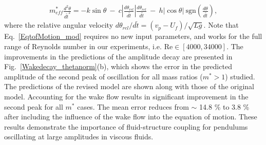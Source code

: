 \documentclass{jfm}
\begin{document}
{{	\begin{align}
	m_{eff}^* \frac{d^2 \theta}{d\tilde{t}^2}= - k \sin{\theta} \ - \ c \left| \frac{d \theta_{rel}}{d \tilde{t}}\right| \frac{d \theta_{rel}}{d \tilde{t}} \ - \ h \left | \cos{\theta} \right | \ \text{sgn} \left( \frac{d \theta} {d\tilde{t}} \right)
	\label{EqtofMotion_mod},
	\end{align}
	where the relative angular velocity $ {d\theta_{rel}}/{d\tilde{t}} = {(v_p - U_f)}/{\sqrt{L g}}$. Note that Eq.~\ref{EqtofMotion_mod} requires no new input parameters, and works for the full range of Reynolds number in our experiments, i.e. $\text{Re} \in [4000, 34000]$.  The improvements in the predictions of the amplitude decay are presented in Fig.~\ref{Wakedecay_thetanorm}(b), which shows the error in the predicted amplitude of the second peak of oscillation for all mass ratios ($m^* >1$) studied.} The predictions of the revised model are shown along with those of the original model. Accounting for the wake flow results in significant improvement in the second peak for all $m^*$ cases. The mean error reduces from $\sim$ 14.8 \% to 3.8 \% after including the influence of the wake flow into the equation of motion. These results demonstrate the importance of fluid-structure coupling for pendulums oscillating at large amplitudes in viscous fluids.} 




\end{document}
